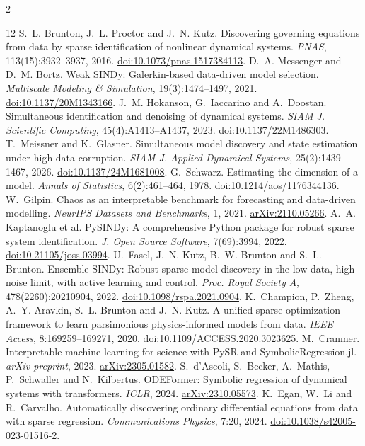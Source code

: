 \documentclass[letterpaper,10pt]{article}
\begin{document}
\clearpage
\begin{multicols}{2}
\begin{thebibliography}{12}
\small
{} S.~L. Brunton, J.~L. Proctor and J.~N. Kutz. Discovering governing equations from data by sparse identification of nonlinear dynamical systems. \emph{PNAS}, 113(15):3932--3937, 2016. \href{https://doi.org/10.1073/pnas.1517384113}{doi:10.1073/pnas.1517384113}.
 D.~A. Messenger and D.~M. Bortz. Weak SINDy: Galerkin-based data-driven model selection. \emph{Multiscale Modeling \& Simulation}, 19(3):1474--1497, 2021. \href{https://doi.org/10.1137/20M1343166}{doi:10.1137/20M1343166}.
 J.~M. Hokanson, G.~Iaccarino and A.~Doostan. Simultaneous identification and denoising of dynamical systems. \emph{SIAM J. Scientific Computing}, 45(4):A1413--A1437, 2023. \href{https://doi.org/10.1137/22M1486303}{doi:10.1137/22M1486303}.
 T.~Meissner and K.~Glasner. Simultaneous model discovery and state estimation under high data corruption. \emph{SIAM J. Applied Dynamical Systems}, 25(2):1439--1467, 2026. \href{https://doi.org/10.1137/24M1681008}{doi:10.1137/24M1681008}.
 G.~Schwarz. Estimating the dimension of a model. \emph{Annals of Statistics}, 6(2):461--464, 1978. \href{https://doi.org/10.1214/aos/1176344136}{doi:10.1214/aos/1176344136}.
 W.~Gilpin. Chaos as an interpretable benchmark for forecasting and data-driven modelling. \emph{NeurIPS Datasets and Benchmarks}, 1, 2021. \href{https://arxiv.org/abs/2110.05266}{arXiv:2110.05266}.
 A.~A. Kaptanoglu et al. PySINDy: A comprehensive Python package for robust sparse system identification. \emph{J. Open Source Software}, 7(69):3994, 2022. \href{https://doi.org/10.21105/joss.03994}{doi:10.21105/joss.03994}.
 U.~Fasel, J.~N. Kutz, B.~W. Brunton and S.~L. Brunton. Ensemble-SINDy: Robust sparse model discovery in the low-data, high-noise limit, with active learning and control. \emph{Proc. Royal Society A}, 478(2260):20210904, 2022. \href{https://doi.org/10.1098/rspa.2021.0904}{doi:10.1098/rspa.2021.0904}.
 K.~Champion, P.~Zheng, A.~Y. Aravkin, S.~L. Brunton and J.~N. Kutz. A unified sparse optimization framework to learn parsimonious physics-informed models from data. \emph{IEEE Access}, 8:169259--169271, 2020. \href{https://doi.org/10.1109/ACCESS.2020.3023625}{doi:10.1109/ACCESS.2020.3023625}.
 M.~Cranmer. Interpretable machine learning for science with PySR and SymbolicRegression.jl. \emph{arXiv preprint}, 2023. \href{https://arxiv.org/abs/2305.01582}{arXiv:2305.01582}.
 S.~d'Ascoli, S.~Becker, A.~Mathis, P.~Schwaller and N.~Kilbertus. ODEFormer: Symbolic regression of dynamical systems with transformers. \emph{ICLR}, 2024. \href{https://arxiv.org/abs/2310.05573}{arXiv:2310.05573}.
 K.~Egan, W.~Li and R.~Carvalho. Automatically discovering ordinary differential equations from data with sparse regression. \emph{Communications Physics}, 7:20, 2024. \href{https://doi.org/10.1038/s42005-023-01516-2}{doi:10.1038/s42005-023-01516-2}.
\end{thebibliography}
\end{multicols}
\end{document}
